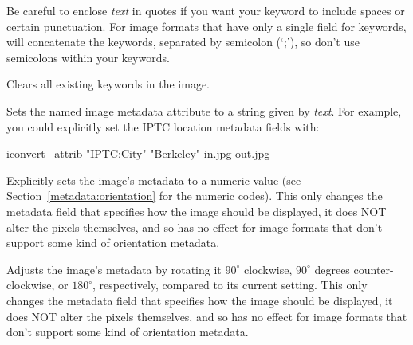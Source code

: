 Be careful to enclose \emph{text} in quotes if you want your keyword to
include spaces or certain punctuation.  For image formats that have only
a single field for keywords, \OpenImageIO will concatenate the keywords,
separated by semicolon (`;'), so don't use semicolons within your
keywords.
\apiend

Clears all existing keywords in the image.
\apiend

Sets the named image metadata attribute to a string given by
\emph{text}.  For example, you could explicitly set the IPTC location
metadata fields with:

\begin{code}
        iconvert --attrib "IPTC:City" "Berkeley" in.jpg out.jpg
\end{code}
\apiend

Explicitly sets the image's  metadata to a numeric
value (see Section~\ref{metadata:orientation} for the numeric codes).
This only changes the metadata field that specifies
how the image should be displayed, it does NOT alter the pixels
themselves, and so has no effect for image formats that don't
support some kind of orientation metadata.
\apiend

Adjusts the image's  metadata by rotating it $90^\circ$
clockwise, $90^\circ$ degrees counter-clockwise, or $180^\circ$,
respectively, compared to its current setting.  This only changes the
metadata field that specifies how the image should be displayed, it does
NOT alter the pixels themselves, and so has no effect for image formats
that don't support some kind of orientation metadata.
\apiend


\chapwidthend
